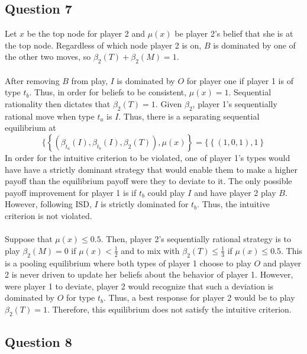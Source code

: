 \documentclass{article}
\begin{document}
\subsection*{Question 7}
Let $x$ be the top node for player 2 and $\mu(x)$ be player 2's belief that she is at the top node. Regardless of which node player 2 is on, $B$ is dominated by one of the other two moves, so ${\beta_2(T) + \beta_2(M) = 1}$. \\
\\
After removing $B$ from play, $I$ is dominated by $O$ for player one if player 1 is of type $t_b$. Thus, in order for beliefs to be consistent, ${\mu(x) = 1}$. Sequential rationality then dictates that ${\beta_2(T)=1}$. Given $\beta_2$, player 1's sequentially rational move when type $t_a$ is $I$. Thus, there is a separating sequential equilibrium at
\[
	\{\left\{(\beta_{t_a}(I),\beta_{t_b}(I),\beta_2(T)),\mu(x)\right\} = \{\left\{(1,0,1),1\right\}
\]
In order for the intuitive criterion to be violated, one of player 1's types would have have a strictly dominant strategy that would enable them to make a higher payoff than the equilibrium payoff were they to deviate to it. The only possible payoff improvement for player 1 is if $t_b$ could play $I$ and have player 2 play $B$. However, following ISD, $I$ is strictly dominated for $t_b$. Thus, the intuitive criterion is not violated. \\
\\
Suppose that ${\mu(x)\leq0.5}$. Then, player 2's sequentially rational strategy is to play ${\beta_2(M)=0}$ if ${\mu(x)<\frac{1}{2}}$ and to mix with ${\beta_2(T)\leq\frac{1}{3}}$ if ${\mu(x)\leq0.5}$. This is a pooling equilibrium where both types of player 1 choose to play $O$ and player 2 is never driven to update her beliefs about the behavior of player 1. However, were player 1 to deviate, player 2 would recognize that such a deviation is dominated by $O$ for type $t_b$. Thus, a best response for player 2 would be to play ${\beta_2(T)=1}$. Therefore, this equilibrium does not satisfy the intuitive criterion.

	



\subsection*{Question 8}
\end{document}
